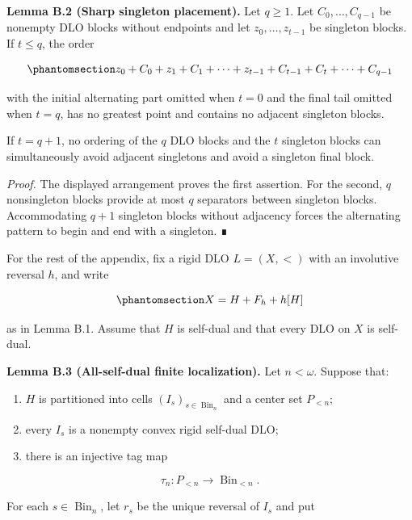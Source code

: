 \documentclass[
  english,
  11pt,
  reqno]{amsart}
\newcounter{none} %
\providecommand{\tightlist}{%
  \setlength{\itemsep}{0pt}\setlength{\parskip}{0pt}}
\begin{document}
\textbf{Lemma B.2 (Sharp singleton placement).} Let \(q\ge1\). Let
\(C_0,\ldots,C_{q-1}\) be nonempty DLO blocks without endpoints and let
\(z_0,\ldots,z_{t-1}\) be singleton blocks. If \(t\le q\), the order

\begin{equation}\protect\phantomsection\label{eq:typefree-singleton-placement}{
z_0+C_0+z_1+C_1+\cdots+z_{t-1}+C_{t-1}
+C_t+\cdots+C_{q-1}
}\end{equation}

with the initial alternating part omitted when \(t=0\) and the final
tail omitted when \(t=q\), has no greatest point and contains no
adjacent singleton blocks.

If \(t=q+1\), no ordering of the \(q\) DLO blocks and the \(t\)
singleton blocks can simultaneously avoid adjacent singletons and avoid
a singleton final block.

\emph{Proof.} The displayed arrangement proves the first assertion. For
the second, \(q\) nonsingleton blocks provide at most \(q\) separators
between singleton blocks. Accommodating \(q+1\) singleton blocks without
adjacency forces the alternating pattern to begin and end with a
singleton. ∎

For the rest of the appendix, fix a rigid DLO \(L=(X,<)\) with an
involutive reversal \(h\), and write

\begin{equation}\protect\phantomsection\label{eq:typefree-root-decomposition}{
X=H+F_h+h[H]
}\end{equation}

as in Lemma B.1. Assume that \(H\) is self-dual and that every DLO on
\(X\) is self-dual.

\protect{}\label{lem:b-3-child-localization}

\textbf{Lemma B.3 (All-self-dual finite localization).} Let
\(n<\omega\). Suppose that:

\begin{enumerate}
\tightlist
\item
  \(H\) is partitioned into cells \((I_s)_{s\in\operatorname{Bin}_n}\)
  and a center set \(P_{<n}\);
\item
  every \(I_s\) is a nonempty convex rigid self-dual DLO;
\item
  there is an injective tag map
\end{enumerate}

\[
   \tau_n:P_{<n}\longrightarrow\operatorname{Bin}_{<n}.
\]

For each \(s\in\operatorname{Bin}_n\), let \(r_s\) be the unique
reversal of \(I_s\) and put
\end{document}
